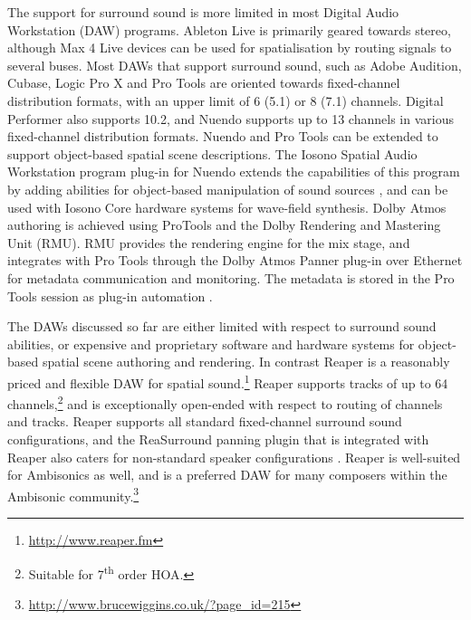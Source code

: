 \documentclass{article}
\begin{document}
The support for surround sound is more limited in most Digital Audio Workstation (DAW) programs.
Ableton Live is primarily geared towards stereo, although Max 4 Live devices can be used for spatialisation by routing signals to several buses.
Most DAWs that support surround sound, such as Adobe Audition, Cubase, Logic Pro X and Pro Tools are oriented towards fixed-channel distribution formats, with an upper limit of 6 (5.1) or 8 (7.1) channels.
Digital Performer also supports 10.2, and Nuendo supports up to 13 channels in various fixed-channel distribution formats.
Nuendo and Pro Tools can be extended to support object-based spatial scene descriptions.
The Iosono Spatial Audio Workstation program plug-in for Nuendo extends the capabilities of this program by adding abilities for object-based manipulation of sound sources \cite{iosono2012:workstation}, and can be used with Iosono Core hardware systems for wave-field synthesis.
Dolby Atmos authoring is achieved using ProTools and the Dolby Rendering and Mastering Unit (RMU).
RMU provides the rendering engine for the mix stage, and integrates with Pro Tools through the Dolby Atmos Panner plug-in over Ethernet for metadata communication and monitoring. 
The metadata is stored in the Pro Tools session as plug-in automation \cite{dolby:2013authoring}.

The DAWs discussed so far are either limited with respect to surround sound abilities, or expensive and proprietary software and hardware systems for object-based spatial scene authoring and rendering.
In contrast Reaper is a reasonably priced and flexible DAW for spatial sound.\footnote{\href{http://www.reaper.fm}{http://www.reaper.fm}}
Reaper supports tracks of up to 64 channels,\footnote{Suitable for 7\textsuperscript{th} order HOA.} and is exceptionally open-ended with respect to routing of channels and tracks.
Reaper supports all standard fixed-channel surround sound configurations, and the ReaSurround panning plugin that is integrated with Reaper also caters for non-standard speaker configurations \cite{francis:2014_reaper}.
Reaper is well-suited for Ambisonics as well, and is a preferred DAW for many composers within the Ambisonic community.\footnote{\href{http://www.brucewiggins.co.uk/?page\_id=215}{http://www.brucewiggins.co.uk/?page\_id=215}}
\end{document}
